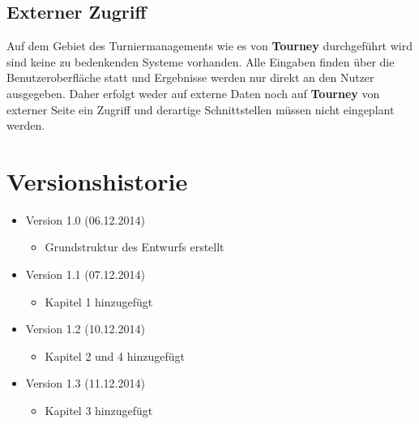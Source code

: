 \documentclass[11pt]{article}
\begin{document}

\subsection{Externer Zugriff}

Auf dem Gebiet des Turniermanagements wie es von \textbf{Tourney} durchgeführt wird sind keine zu bedenkenden Systeme vorhanden. Alle Eingaben finden über die Benutzeroberfläche statt und Ergebnisse werden nur direkt an den Nutzer ausgegeben. Daher erfolgt weder auf externe Daten noch auf \textbf{Tourney} von externer Seite ein Zugriff und derartige Schnittstellen müssen nicht eingeplant werden.

\section{Versionshistorie}

\begin{itemize}
	\item Version 1.0 (06.12.2014)
	\begin{itemize}
		\item Grundstruktur des Entwurfs erstellt
	\end{itemize}
	\item Version 1.1 (07.12.2014)
	\begin{itemize}
		\item Kapitel 1 hinzugefügt
	\end{itemize}
	\item Version 1.2 (10.12.2014)
	\begin{itemize}
		\item Kapitel 2 und 4 hinzugefügt
	\end{itemize}
	\item Version 1.3 (11.12.2014)
	\begin{itemize}
		\item Kapitel 3 hinzugefügt
	\end{itemize}
\end{itemize}
\end{document}

